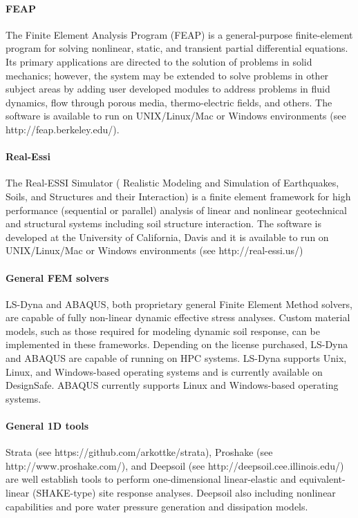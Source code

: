 \paragraph{FEAP} The Finite Element Analysis Program (FEAP) is a general-purpose finite-element program for solving nonlinear, static, and transient partial differential equations. Its primary applications are directed to the solution of problems in solid mechanics; however, the system may be extended to solve problems in other subject areas by adding user developed modules to address problems in fluid dynamics, flow through porous media, thermo-electric fields, and others. The software is available to run on UNIX/Linux/Mac or Windows environments (see http://feap.berkeley.edu/).\\

\paragraph{Real-Essi} The Real-ESSI Simulator ( Realistic Modeling and Simulation of Earthquakes, Soils, and Structures and their Interaction) is a finite element framework for high performance (sequential or parallel) analysis of linear and nonlinear geotechnical and structural systems including soil structure interaction. The software is developed at the University of California, Davis and it is available to run on UNIX/Linux/Mac or Windows environments (see http://real-essi.us/)

\paragraph{General FEM solvers}
LS-Dyna and ABAQUS, both proprietary general Finite Element Method solvers, are capable of fully non-linear dynamic effective stress analyses. Custom material models, such as those required for modeling dynamic soil response, can be implemented in these frameworks. Depending on the license purchased, LS-Dyna and ABAQUS are capable of running on HPC systems. LS-Dyna supports Unix, Linux, and Windows-based operating systems and is currently available on DesignSafe. ABAQUS currently supports Linux and Windows-based operating systems.\\

\paragraph{General 1D tools}
Strata (see https://github.com/arkottke/strata), Proshake (see http://www.proshake.com/), and Deepsoil (see http://deepsoil.cee.illinois.edu/) are well establish tools to perform one-dimensional linear-elastic and equivalent-linear (SHAKE-type) site response analyses. Deepsoil also including nonlinear capabilities and pore water pressure generation and dissipation models.\\

